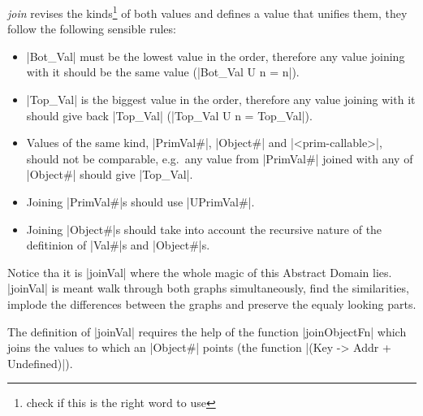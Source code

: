 \emph{join} revises the kinds\footnote{check if this is the right word
  to use} of both values and defines a value that unifies them, they
follow the following sensible rules:

\begin{itemize}
\tightlist
\item
  \pycode|Bot_Val| must be the lowest value in the order, therefore any
  value joining with it should be the same value
  (\pycode|Bot_Val U n = n|).
\item
  \pycode|Top_Val| is the biggest value in the order, therefore any
  value joining with it should give back \pycode|Top_Val|
  (\pycode|Top_Val U n = Top_Val|).
\item
  Values of the same kind, \pycode|PrimVal#|, \pycode|Object#| and
  \pycode|<prim-callable>|, should not be
  comparable, e.g.~any value from \pycode|PrimVal#| joined with any of
  \pycode|Object#| should give \pycode|Top_Val|.
\item
  Joining \pycode|PrimVal#|s should use \pycode|UPrimVal#|.
\item
  Joining \pycode|Object#|s should take into account the recursive
  nature of the defitinion of \pycode|Val#|s and \pycode|Object#|s.
\end{itemize}

Notice tha it is \pycode|joinVal| where the whole magic of this Abstract
Domain lies. \pycode|joinVal| is meant walk through both graphs
simultaneously, find the similarities, implode the differences between
the graphs and preserve the equaly looking parts.

The definition of \pycode|joinVal| requires the help of the function
\pycode|joinObjectFn| which joins the values to which an
\pycode|Object#| points (the function
\pycode|(Key -> Addr + Undefined)|).

